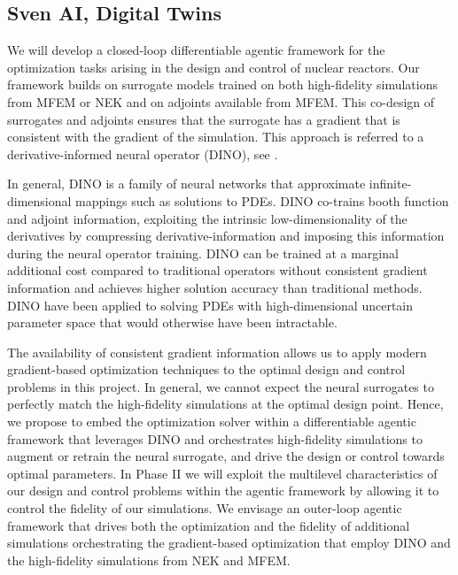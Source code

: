 \subsection{Sven AI, Digital Twins}

We will develop a closed-loop differentiable agentic framework for the optimization tasks arising in the design and control of nuclear reactors. Our framework builds on surrogate models trained on both high-fidelity simulations from MFEM or NEK and on adjoints available from MFEM. This co-design of surrogates and adjoints ensures that the surrogate has a gradient that is consistent with the gradient of the simulation. This approach is referred to a derivative-informed neural operator (DINO), see \cite{o2024derivative,luo2025efficient,cao2025derivative,wu2023large}.

In general, DINO is a family of neural networks that approximate infinite-dimensional mappings such as solutions to PDEs. DINO co-trains booth function and adjoint information, exploiting the intrinsic low-dimensionality of the derivatives by compressing derivative-information and imposing this information during the neural operator training. DINO can be trained at a marginal additional cost compared to traditional operators without consistent gradient information and achieves higher solution accuracy than traditional methods. DINO have been applied to solving PDEs with high-dimensional uncertain parameter space that would otherwise have been intractable.

The availability of consistent gradient information allows us to apply modern gradient-based optimization techniques to the optimal design and control problems in this project. In general, we cannot expect the neural surrogates to perfectly match the high-fidelity simulations at the optimal design point. Hence, we propose to embed the optimization solver within a differentiable agentic framework that leverages DINO and orchestrates high-fidelity simulations to augment or retrain the neural surrogate, and drive the design or control towards optimal parameters. In Phase II we will exploit the multilevel characteristics of our design and control problems within the agentic framework by allowing it to control the fidelity of our simulations. We envisage an outer-loop agentic framework that drives both the optimization and the fidelity of additional  simulations orchestrating the gradient-based optimization that employ DINO and the high-fidelity simulations from NEK and MFEM.
